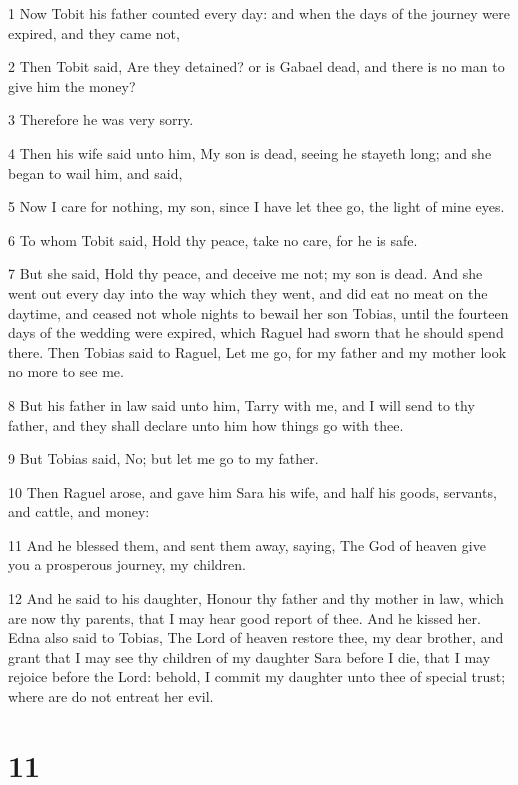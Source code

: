 \par 1 Now Tobit his father counted every day: and when the days of the journey were expired, and they came not,
\par 2 Then Tobit said, Are they detained? or is Gabael dead, and there is no man to give him the money?
\par 3 Therefore he was very sorry.
\par 4 Then his wife said unto him, My son is dead, seeing he stayeth long; and she began to wail him, and said,
\par 5 Now I care for nothing, my son, since I have let thee go, the light of mine eyes.
\par 6 To whom Tobit said, Hold thy peace, take no care, for he is safe.
\par 7 But she said, Hold thy peace, and deceive me not; my son is dead. And she went out every day into the way which they went, and did eat no meat on the daytime, and ceased not whole nights to bewail her son Tobias, until the fourteen days of the wedding were expired, which Raguel had sworn that he should spend there. Then Tobias said to Raguel, Let me go, for my father and my mother look no more to see me.
\par 8 But his father in law said unto him, Tarry with me, and I will send to thy father, and they shall declare unto him how things go with thee.
\par 9 But Tobias said, No; but let me go to my father.
\par 10 Then Raguel arose, and gave him Sara his wife, and half his goods, servants, and cattle, and money:
\par 11 And he blessed them, and sent them away, saying, The God of heaven give you a prosperous journey, my children.
\par 12 And he said to his daughter, Honour thy father and thy mother in law, which are now thy parents, that I may hear good report of thee. And he kissed her. Edna also said to Tobias, The Lord of heaven restore thee, my dear brother, and grant that I may see thy children of my daughter Sara before I die, that I may rejoice before the Lord: behold, I commit my daughter unto thee of special trust; where are do not entreat her evil.

\chapter{11}

